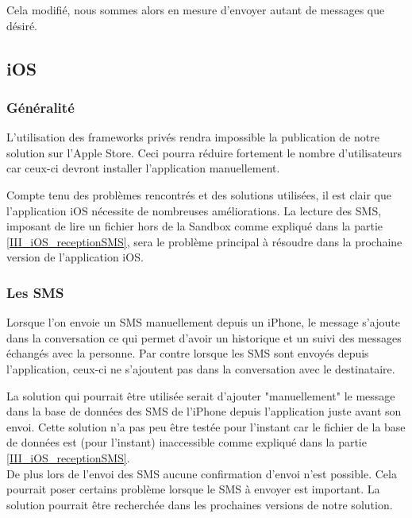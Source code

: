 Cela modifié, nous sommes alors en mesure d'envoyer autant de messages que désiré. 
\\




\subsection{iOS}


\subsubsection{Généralité}

L'utilisation des frameworks privés rendra impossible la publication de notre solution sur l'Apple Store.
Ceci pourra réduire fortement le nombre d'utilisateurs car ceux-ci devront installer l'application manuellement. 

Compte tenu des problèmes rencontrés et des solutions utilisées, il est clair que l'application iOS nécessite de nombreuses améliorations.
La lecture des SMS, imposant de lire un fichier hors de la Sandbox comme expliqué dans la partie \ref{III_iOS_receptionSMS}, sera le problème principal à résoudre dans la prochaine version de l'application iOS.
\\


\subsubsection{Les SMS}

Lorsque l'on envoie un SMS manuellement depuis un iPhone, le message s'ajoute dans la conversation ce qui permet d'avoir un historique et un suivi des messages échangés avec la personne.
Par contre lorsque les SMS sont envoyés depuis l'application, ceux-ci ne s'ajoutent pas dans la conversation avec le destinataire.

La solution qui pourrait être utilisée serait d'ajouter "manuellement" le message dans la base de données des SMS de l'iPhone depuis l'application juste avant son envoi.
Cette solution n'a pas peu être testée pour l'instant car le fichier de la base de données est (pour l'instant) inaccessible comme expliqué dans la partie \ref{III_iOS_receptionSMS}.
\\

De plus lors de l'envoi des SMS aucune confirmation d'envoi n'est possible.
Cela pourrait poser certains problème lorsque le SMS à envoyer est important.
La solution pourrait être recherchée dans les prochaines versions de notre solution.
\\
